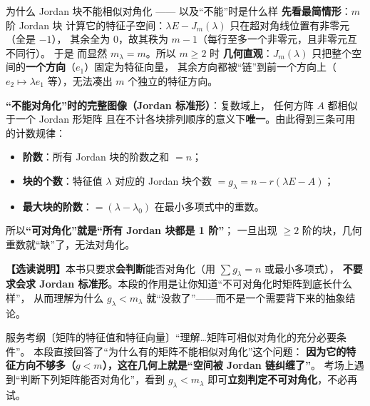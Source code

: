 \begin{fdeep}{为什么 Jordan 块不能相似对角化 —— 以及“不能”时是什么样}
\textbf{先看最简情形}：$m$ 阶 Jordan 块
计算它的特征子空间：$\lambda E-J_{m}(\lambda)$ 只在超对角线位置有非零元（全是 $-1$），
其余全为 $0$，故其秩为 $m-1$（每行至多一个非零元，且非零元互不同行）。
于是
而显然 $m_{\lambda}=m$。所以 $m\ge2$ 时
\textbf{几何直观}：$J_{m}(\lambda)$ 只把整个空间的\textbf{一个方向}（$e_1$）固定为特征向量，
其余方向都被“链”到前一个方向上（$e_2\mapsto\lambda e_1$ 等），无法凑出 $m$ 个独立的特征方向。

\medskip
\textbf{“不能对角化”时的完整图像（Jordan 标准形）}：复数域上，
任何方阵 $A$ 都相似于一个 Jordan 形矩阵
且在不计各块排列顺序的意义下\textbf{唯一}。由此得到三条可用的计数规律：
\begin{itemize}[leftmargin=2.2em,itemsep=0.22em]
\item \textbf{阶数}：所有 Jordan 块的阶数之和 $=n$；
\item \textbf{块的个数}：特征值 $\lambda$ 对应的 Jordan 块个数 $=g_{\lambda}=n-r(\lambda E-A)$；
\item \textbf{最大块的阶数}：$=(\lambda-\lambda_0)$ 在最小多项式中的重数。
\end{itemize}
所以\textbf{“可对角化”就是“所有 Jordan 块都是 1 阶”}；
一旦出现 $\ge2$ 阶的块，几何重数就“缺”了，无法对角化。

\textbf{【选读说明】}本书只要求\textbf{会判断}能否对角化（用 $\sum g_{\lambda}=n$ 或最小多项式），
\textbf{不要求会求 Jordan 标准形}。本段的作用是让你知道“不可对角化时矩阵到底长什么样”，
从而理解为什么 $g_{\lambda}<m_{\lambda}$ 就“没救了”——而不是一个需要背下来的抽象结论。

\fbref{}服务考纲〔矩阵的特征值和特征向量〕“理解…矩阵可相似对角化的充分必要条件”。
本段直接回答了“为什么有的矩阵不能相似对角化”这个问题：
\textbf{因为它的特征方向不够多（$g<m$），这在几何上就是“空间被 Jordan 链纠缠了”}。
考场上遇到“判断下列矩阵能否对角化”，看到 $g_{\lambda}<m_{\lambda}$ 即可\textbf{立刻判定不可对角化}，不必再试。
\end{fdeep}

